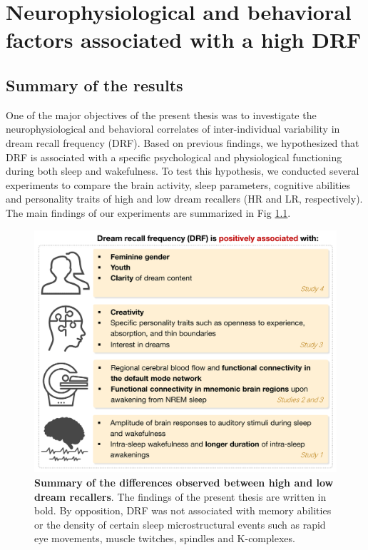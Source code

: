 \cleardoublepage
\chapter{Neurophysiological and behavioral factors associated with a high DRF}
\label{disc:drf}

\section{Summary of the results}
\label{disc:drf:summary}

One of the major objectives of the present thesis was to investigate the neurophysiological and behavioral correlates of inter-individual variability in dream recall frequency (DRF). Based on previous findings, we hypothesized that DRF is associated with a specific psychological and physiological functioning during both sleep and wakefulness. To test this hypothesis, we conducted several experiments to compare the brain activity, sleep parameters, cognitive abilities and personality traits of high and low dream recallers (HR and LR, respectively). The main findings of our experiments are summarized in Fig \ref{fig:disc:drf:summary}.

\begin{figure}[!htb]
	\includegraphics[width=\textwidth]{Fig/Discussion/HR_recap.png}
	\caption[Summary of the results on DRF]{\textbf{Summary of the differences observed between high and low dream recallers}. The findings of the present thesis are written in bold. By opposition, DRF was not associated with memory abilities or the density of certain sleep microstructural events such as rapid eye movements, muscle twitches, spindles and K-complexes.}
	\label{fig:disc:drf:summary}
\end{figure}

